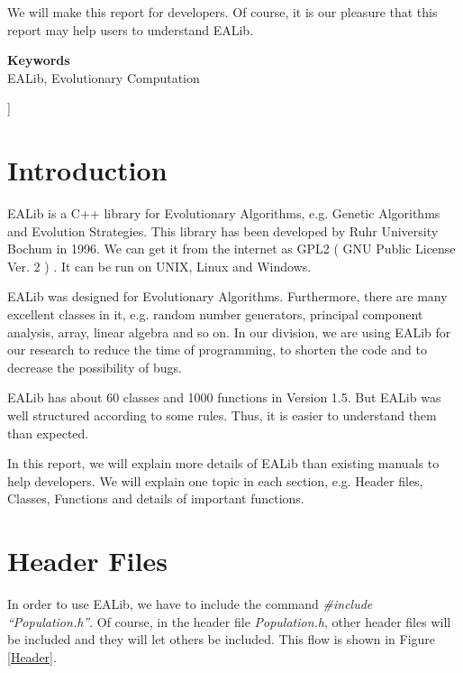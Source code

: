 \documentclass[twocolumn]{article}
\begin{document}
\noindent
We will make this report for developers. Of course, it is our pleasure
that this report may help users to understand EALib.

\vspace*{5mm}

\noindent
{\bf Keywords}\\
\noindent
EALib, Evolutionary Computation

\vspace*{10mm}
]

\section{Introduction}

\noindent
EALib is a C++ library for Evolutionary Algorithms, e.g. Genetic
Algorithms and Evolution Strategies. This library has been developed
by Ruhr University Bochum in 1996. We can get it from the
internet \cite{EALib-Address} as GPL2 ( GNU Public License Ver. 2 )
\cite{GPL2}. It can be run on UNIX, Linux and Windows.

\noindent
EALib was designed for Evolutionary Algorithms. Furthermore, there
are many excellent classes in it, e.g. random number generators,
principal component analysis, array, linear algebra and so on. In our
division, we are using EALib for our research to reduce the time of
programming, to shorten the code and to decrease the possibility of 
bugs. 

\noindent
EALib has about 60 classes and 1000 functions in Version
1.5. But EALib was well structured according to some rules. Thus, it
is easier to understand them than expected.

\noindent
In this report, we will explain more details of EALib than existing
manuals to help developers. We will explain one topic in each
section, e.g. Header files, Classes, Functions and details of
important functions.

\section{Header Files}

\noindent
In order to use EALib, we have to include the command {\em \#include
``Population.h''}. Of course, in the header file {\em Population.h},
other header files will be included and they will let others be
included. This flow is shown in Figure \ref{Header}.
\end{document}
